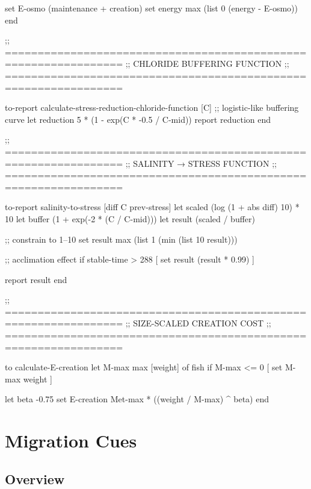 \documentclass[
]{book}
\newenvironment{Shaded}{\begin{snugshade}}{\end{snugshade}}
\newcommand{\NormalTok}[1]{#1}
\begin{document}
\begin{Shaded}
\begin{Highlighting}[]
\NormalTok{  set E{-}osmo (maintenance + creation)}
\NormalTok{  set energy max (list 0 (energy {-} E{-}osmo))}
\NormalTok{end}


\NormalTok{;; ================================================================}
\NormalTok{;; CHLORIDE BUFFERING FUNCTION}
\NormalTok{;; ================================================================}

\NormalTok{to{-}report calculate{-}stress{-}reduction{-}chloride{-}function [C]}
\NormalTok{  ;; logistic{-}like buffering curve}
\NormalTok{  let reduction 5 * (1 {-} exp(C * {-}0.5 / C{-}mid))}
\NormalTok{  report reduction}
\NormalTok{end}


\NormalTok{;; ================================================================}
\NormalTok{;; SALINITY → STRESS FUNCTION}
\NormalTok{;; ================================================================}

\NormalTok{to{-}report salinity{-}to{-}stress [diff C prev{-}stress]}
\NormalTok{  let scaled (log (1 + abs diff) 10) * 10}
\NormalTok{  let buffer   (1 + exp({-}2 * (C / C{-}mid)))}
\NormalTok{  let result   (scaled / buffer)}

\NormalTok{  ;; constrain to 1–10}
\NormalTok{  set result max (list 1 (min (list 10 result)))}

\NormalTok{  ;; acclimation effect}
\NormalTok{  if stable{-}time \textgreater{} 288 [}
\NormalTok{    set result (result * 0.99)}
\NormalTok{  ]}

\NormalTok{  report result}
\NormalTok{end}


\NormalTok{;; ================================================================}
\NormalTok{;; SIZE{-}SCALED CREATION COST}
\NormalTok{;; ================================================================}

\NormalTok{to calculate{-}E{-}creation}
\NormalTok{  let M{-}max max [weight] of fish}
\NormalTok{  if M{-}max \textless{}= 0 [ set M{-}max weight ]}

\NormalTok{  let beta {-}0.75}
\NormalTok{  set E{-}creation Met{-}max * ((weight / M{-}max) \^{} beta)}
\NormalTok{end}
\end{Highlighting}
\end{Shaded}

\chapter{Migration Cues}\label{migration-cues}

\section{Overview}\label{overview-3}
\end{document}
